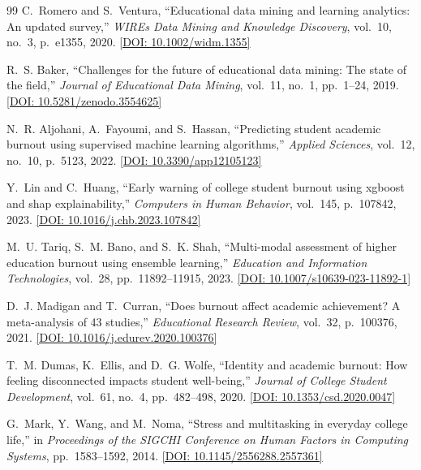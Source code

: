 \documentclass[12pt,a4paper,oneside]{report}
\begin{document}
\begin{thebibliography}{99}
C.~Romero and S.~Ventura,
\newblock ``Educational data mining and learning analytics: An updated survey,''
\newblock \emph{WIREs Data Mining and Knowledge Discovery}, vol.~10, no.~3, p.~e1355, 2020. \href{https://doi.org/10.1002/widm.1355}{[DOI: 10.1002/widm.1355]}

R.~S. Baker,
\newblock ``Challenges for the future of educational data mining: The state of the field,''
\newblock \emph{Journal of Educational Data Mining}, vol.~11, no.~1, pp.~1--24, 2019. \href{https://doi.org/10.5281/zenodo.3554625}{[DOI: 10.5281/zenodo.3554625]}

N.~R. Aljohani, A.~Fayoumi, and S.~Hassan,
\newblock ``Predicting student academic burnout using supervised machine learning algorithms,''
\newblock \emph{Applied Sciences}, vol.~12, no.~10, p.~5123, 2022. \href{https://doi.org/10.3390/app12105123}{[DOI: 10.3390/app12105123]}

Y.~Lin and C.~Huang,
\newblock ``Early warning of college student burnout using xgboost and shap explainability,''
\newblock \emph{Computers in Human Behavior}, vol.~145, p.~107842, 2023. \href{https://doi.org/10.1016/j.chb.2023.107842}{[DOI: 10.1016/j.chb.2023.107842]}

M.~U. Tariq, S.~M. Bano, and S.~K. Shah,
\newblock ``Multi-modal assessment of higher education burnout using ensemble learning,''
\newblock \emph{Education and Information Technologies}, vol.~28, pp.~11892--11915, 2023. \href{https://doi.org/10.1007/s10639-023-11892-1}{[DOI: 10.1007/s10639-023-11892-1]}

D.~J. Madigan and T.~Curran,
\newblock ``Does burnout affect academic achievement? A meta-analysis of 43 studies,''
\newblock \emph{Educational Research Review}, vol.~32, p.~100376, 2021. \href{https://doi.org/10.1016/j.edurev.2020.100376}{[DOI: 10.1016/j.edurev.2020.100376]}

T.~M. Dumas, K.~Ellis, and D.~G. Wolfe,
\newblock ``Identity and academic burnout: How feeling disconnected impacts student well-being,''
\newblock \emph{Journal of College Student Development}, vol.~61, no.~4, pp.~482--498, 2020. \href{https://doi.org/10.1353/csd.2020.0047}{[DOI: 10.1353/csd.2020.0047]}

G.~Mark, Y.~Wang, and M.~Noma,
\newblock ``Stress and multitasking in everyday college life,''
\newblock in \emph{Proceedings of the SIGCHI Conference on Human Factors in Computing Systems}, pp.~1583--1592, 2014. \href{https://doi.org/10.1145/2556288.2557361}{[DOI: 10.1145/2556288.2557361]}


\end{thebibliography}
\end{document}
